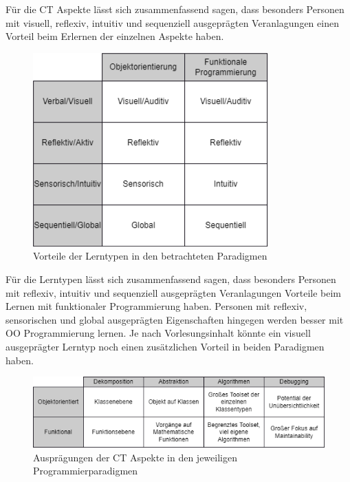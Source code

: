 Für die CT Aspekte lässt sich zusammenfassend sagen, dass besonders Personen mit visuell, reflexiv, intuitiv und sequenziell ausgeprägten Veranlagungen einen Vorteil beim Erlernen der einzelnen Aspekte haben.

\begin{figure}[H]
    \centering
    \includegraphics[width=1\linewidth]{Figures/Section_3/Styles_Paradigms}
    \caption{Vorteile der Lerntypen in den betrachteten Paradigmen}
\end{figure}

Für die Lerntypen lässt sich zusammenfassend sagen, dass besonders Personen mit reflexiv, intuitiv und sequenziell ausgeprägten Veranlagungen Vorteile beim Lernen mit funktionaler Programmierung haben.
Personen mit reflexiv, sensorischen und global ausgeprägten Eigenschaften hingegen werden besser mit OO Programmierung lernen.
Je nach Vorlesungsinhalt könnte ein visuell ausgeprägter Lerntyp noch einen zusätzlichen Vorteil in beiden Paradigmen haben.

\begin{figure}[H]
    \centering
    \includegraphics[width=1\linewidth]{Figures/Section_3/CT_Paradigms}
    \caption{Ausprägungen der CT Aspekte in den jeweiligen Programmierparadigmen}
\end{figure}

